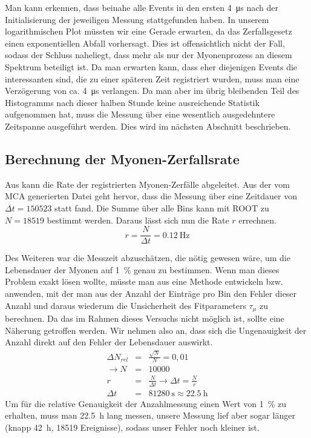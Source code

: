 Man kann erkennen, dass beinahe alle Events in den ersten \SI{4}{\micro\second}
nach der Initialisierung der jeweiligen Messung stattgefunden haben. In unserem
logarithmischen Plot müssten wir eine Gerade erwarten, da das Zerfallsgesetz
einen exponentiellen Abfall vorhersagt. Dies ist offensichtlich nicht der Fall,
sodass der Schluss naheliegt, dass mehr als nur der Myonenprozess an diesem
Spektrum beteiligt ist. Da man erwarten kann, dass eher diejenigen Events
die interessanten sind, die zu einer späteren Zeit registriert wurden, muss man
eine Verzögerung von ca. \SI{4}{\micro\second} verlangen. Da man aber im übrig
bleibenden Teil des Histogramms nach dieser halben Stunde keine ausreichende
Statistik aufgenommen hat, muss die Messung über eine wesentlich ausgedehntere
Zeitspanne ausgeführt werden. Dies wird im nächsten Abschnitt beschrieben.

\subsection{Berechnung der Myonen-Zerfallsrate}

Aus  kann die Rate der registrierten Myonen-Zerfälle abgeleitet.
Aus der vom MCA generierten Datei geht hervor, dass die Messung
über eine Zeitdauer von $Δt = 150523$ statt fand. Die Summe über alle Bins kann
mit ROOT zu $N = 18519$ bestimmt werden. Daraus lässt sich nun die Rate $r$ errechnen.
\begin{equation}
 r = \frac{N}{Δt} = \SI{0.12}{\hertz}
\end{equation}

Des Weiteren war die Messzeit abzuschätzen, die nötig gewesen wäre, um die
Lebensdauer der Myonen auf \SI{1}{\percent} genau zu bestimmen. Wenn man dieses
Problem exakt lösen wollte, müsste man aus eine Methode entwickeln bzw.
anwenden, mit der man aus der Anzahl der Einträge pro Bin den Fehler dieser
Anzahl und daraus wiederum die Unsicherheit des Fitparameters $τ_μ$ zu
berechnen. Da das im Rahmen dieses Versuchs nicht möglich ist, sollte eine
Näherung getroffen werden. Wir nehmen also an, dass sich die Ungenauigkeit der
Anzahl direkt auf den Fehler der Lebensdauer auswirkt.
\begin{eqnarray}
\Delta N_{rel} &=& \frac{\sqrt{N}}{N} = 0,01\\
\rightarrow N &=& 10000\\
r &=& \frac{N}{Δt} \rightarrow Δt = \frac{N}{r}\\
Δt &=& \SI{81280}{\second} \approx \SI{22,5}{\hour}
\end{eqnarray}
Um für die relative Genauigkeit der Anzahlmessung einen Wert von
\SI{1}{\percent} zu erhalten, muss man \SI{22,5}{\hour} lang messen, unsere
Messung lief aber sogar länger (knapp \SI{42}{\hour}, 18519 Ereignisse), sodass
unser Fehler noch kleiner ist.


